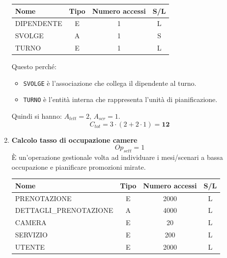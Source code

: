 \documentclass[a4paper,12pt]{report}
\begin{document}
\begin{enumerate}
	      \begin{table}[H]
		      \centering
		      \small
		      \renewcommand{\arraystretch}{1.15}
		      \begin{tabularx}{0.8\textwidth}{|X|c|c|c|}
			      \hline
			      \rowcolor{gray!20}
			      \textbf{Nome} & \textbf{Tipo} & \textbf{Numero accessi} & \textbf{S/L} \\
			      \hline
			      DIPENDENTE    & E             & 1                       & L            \\
			      SVOLGE        & A             & 1                       & S            \\
			      TURNO         & E             & 1                       & L            \\
			      \hline
		      \end{tabularx}
	      \end{table}


	      Questo perché:
	      \begin{itemize}
		      \item \texttt{SVOLGE} è l'associazione che collega il dipendente al turno.
		      \item \texttt{TURNO} è l'entità interna che rappresenta l'unità di pianificazione.
	      \end{itemize}

	      Quindi si hanno: $A_{lett}=2$, $A_{scr}=1$.
	      $$C_{tot} = 3 \cdot (2 + 2 \cdot 1) = \mathbf{12}$$


	\item {\large \textbf{Calcolo tasso di occupazione camere}} \label{op10}
	      $$
		      {Op}_{sett} = 1
	      $$
	      È un'operazione gestionale volta ad individuare i mesi/scenari a bassa occupazione e pianificare promozioni mirate.

	      \begin{table}[H]
		      \centering
		      \small
		      \renewcommand{\arraystretch}{1.15}
		      \begin{tabularx}{0.8\textwidth}{|X|c|c|c|}
			      \hline
			      \rowcolor{gray!20}
			      \textbf{Nome}          & \textbf{Tipo} & \textbf{Numero accessi} & \textbf{S/L} \\
			      \hline
			      PRENOTAZIONE           & E             & 2000                    & L            \\
			      DETTAGLI\_PRENOTAZIONE & A             & 4000                    & L            \\
			      CAMERA                 & E             & 20                      & L            \\
			      SERVIZIO               & E             & 200                     & L            \\
			      UTENTE                 & E             & 2000                    & L            \\
			      \hline
		      \end{tabularx}
	      \end{table}


\end{enumerate}
\end{document}
